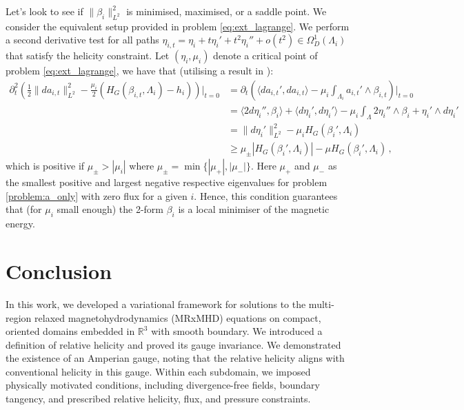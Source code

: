 \documentclass[11pt]{article}
\theoremstyle{plain}
\theoremstyle{definition}
\theoremstyle{remark}
\newcommand{\ST}{\Lambda}
\begin{document}
Let's look to see if \(\| \beta_i  \|_{L^2}^2\) is minimised, maximised, or a saddle point. We consider the equivalent setup provided in problem \eqref{eq:ext_lagrange}. We perform a second derivative test for all paths \(\eta_{i,t} = \eta_i + t \eta_i' + t^2 \eta_i'' + o(t^2) \in \Omega^1_D( \ST_i )\) that satisfy the helicity constraint. Let \((\eta_i, \mu_i)\) denote a critical point of problem \eqref{eq:ext_lagrange}, we have that (utilising a result in \cite{exist_gerner}):
\begin{align*}
    \partial_t^2  \left( \frac{1}{2} \big\| d a_{i,t} \big\|_{L^2}^2 - \frac{\mu_i}{2} \left(   H_G (\beta_{i,t},  \ST_i) -  h_i      \right) \right) \Bigg|_{t=0} 
    & = \partial_t  \left( \langle da_{i,t}' , da_{i,t} \rangle
    - \mu_i \int_{\ST_i } a_{i,t}' \wedge \beta _{i,t} 
    \right)\Bigg|_{t=0} \\
    & =    \langle 2 d \eta_i'' , \beta_i  \rangle + \langle d \eta_i' , d \eta_i' \rangle
    - \mu_i \int_{\ST } 2 \eta_i'' \wedge \beta_i  + \eta_i' \wedge d \eta_i' 
    \\
    & = \| d \eta_i' \|^2_{L^2 }  -  \mu_i H_G (\beta_i', \ST_i) \\ & \geq \mu_{\pm} |H_G (\beta_i', \ST_i)|  -  \mu H_G (\beta_i', \ST_i) \, ,
\end{align*}
which is positive if \(\mu_{\pm} > |\mu_i|\) where \(\mu_{\pm} = \min \{ |\mu_+|,|\mu_- |\} \). Here \(\mu_+\) and \(\mu_-\) as the smallest positive and largest negative respective eigenvalues for problem \eqref{problem:a_only} with zero flux for a given \(i\). Hence, this condition guarantees that (for \(\mu_i\) small enough) the 2-form \(\beta_i \) is a local minimiser of the magnetic energy.







\section{Conclusion}\label{section:Conclusion}



In this work, we developed a variational framework for solutions to the multi-region relaxed magnetohydrodynamics (MRxMHD) equations on compact, oriented domains embedded in \(\mathbb{R}^3\) with smooth boundary. We introduced a definition of relative helicity and proved its gauge invariance. We demonstrated the existence of an Amperian gauge, noting that the relative helicity aligns with conventional helicity in this gauge. Within each subdomain, we imposed physically motivated conditions, including divergence-free fields, boundary tangency, and prescribed relative helicity, flux, and pressure constraints.
\end{document}
